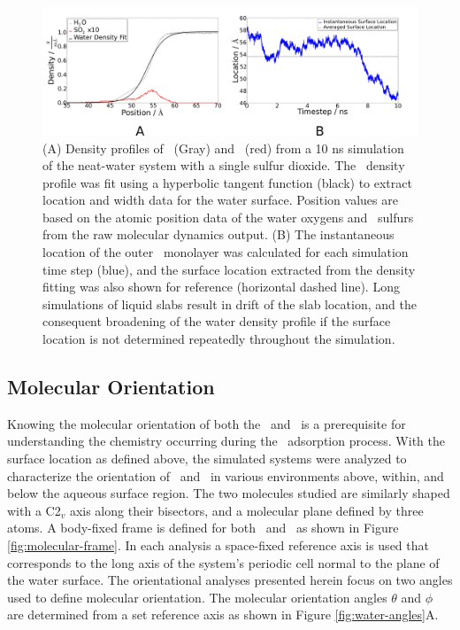 \documentclass{article}
\begin{document}
\begin{figure}[h!]
	\begin{center}
		\includegraphics[scale=1.0]{images/density-location.png}
		\caption{(A) Density profiles of \wat~(Gray) and \suldiox~(red) from a 10 ns simulation of the neat-water system with a single sulfur dioxide. The \wat~density profile was fit using a hyperbolic tangent function (black) to extract location and width data for the water surface. Position values are based on the atomic position data of the water oxygens and \suldiox~sulfurs from the raw molecular dynamics output. (B) The instantaneous location of the outer \wat~monolayer was calculated for each simulation time step (blue), and the surface location extracted from the density fitting was also shown for reference (horizontal dashed line). Long simulations of liquid slabs result in drift of the slab location, and the consequent broadening of the water density profile if the surface location is not determined repeatedly throughout the simulation.}
		\label{fig:density-flaw}
	\end{center}
\end{figure}



\subsection{Molecular Orientation}

Knowing the molecular orientation of both the \wat~and \suldiox~is a prerequisite for understanding the chemistry occurring during the \suldiox~adsorption process. With the surface location as defined above, the simulated systems were analyzed to characterize the orientation of \wat~and \suldiox~in various environments above, within, and below the aqueous surface region. The two molecules studied are similarly shaped with a C2$_v$ axis along their bisectors, and a molecular plane defined by three atoms. A body-fixed frame is defined for both \wat~and \suldiox~as shown in Figure \ref{fig:molecular-frame}. In each analysis a space-fixed reference axis is used that corresponds to the long axis of the system's periodic cell normal to the plane of the water surface. The orientational analyses presented herein focus on two angles used to define molecular orientation. The molecular orientation angles $\theta$ and $\phi$ are determined from a set reference axis as shown in Figure \ref{fig:water-angles}A.
	
\end{document}
